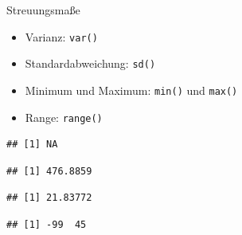\documentclass[ignorenonframetext,]{beamer}
\newenvironment{Shaded}{}{}
\newcommand{\KeywordTok}[1]{\textcolor[rgb]{0.00,0.44,0.13}{\textbf{{#1}}}}
\newcommand{\DataTypeTok}[1]{\textcolor[rgb]{0.56,0.13,0.00}{{#1}}}
\newcommand{\NormalTok}[1]{{#1}}
\providecommand{\tightlist}{%
\setlength{\itemsep}{0pt}\setlength{\parskip}{0pt}}
\begin{document}
\begin{frame}[fragile]{Streuungsmaße}

\begin{itemize}
\tightlist
\item
  Varianz: \texttt{var()}
\item
  Standardabweichung: \texttt{sd()}
\item
  Minimum und Maximum: \texttt{min()} und \texttt{max()}
\item
  Range: \texttt{range()}
\end{itemize}

\begin{Shaded}
\end{Shaded}

\begin{verbatim}
## [1] NA
\end{verbatim}

\begin{Shaded}
\end{Shaded}

\begin{verbatim}
## [1] 476.8859
\end{verbatim}

\begin{Shaded}
\end{Shaded}

\begin{verbatim}
## [1] 21.83772
\end{verbatim}

\begin{Shaded}
\end{Shaded}

\begin{verbatim}
## [1] -99  45
\end{verbatim}

\end{frame}
\end{document}
